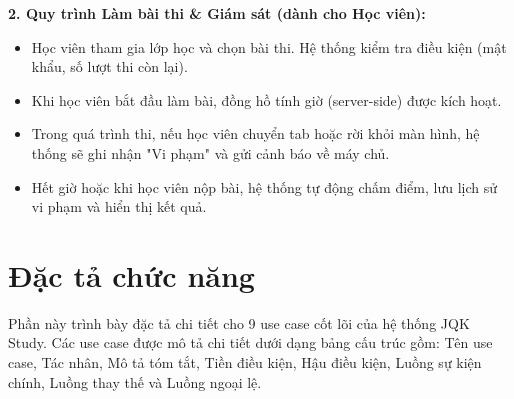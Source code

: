 \documentclass[../DoAn.tex]{subfiles}
\begin{document}
\textbf{2. Quy trình Làm bài thi \& Giám sát (dành cho Học viên):}
\begin{itemize}
    \item Học viên tham gia lớp học và chọn bài thi. Hệ thống kiểm tra điều kiện (mật khẩu, số lượt thi còn lại).
    \item Khi học viên bắt đầu làm bài, đồng hồ tính giờ (server-side) được kích hoạt.
    \item Trong quá trình thi, nếu học viên chuyển tab hoặc rời khỏi màn hình, hệ thống sẽ ghi nhận "Vi phạm" và gửi cảnh báo về máy chủ.
    \item Hết giờ hoặc khi học viên nộp bài, hệ thống tự động chấm điểm, lưu lịch sử vi phạm và hiển thị kết quả.
\end{itemize}

\section{Đặc tả chức năng}
\label{section:2.3}

Phần này trình bày đặc tả chi tiết cho 9 use case cốt lõi của hệ thống JQK Study. Các use case được mô tả chi tiết dưới dạng bảng cấu trúc gồm: Tên use case, Tác nhân, Mô tả tóm tắt, Tiền điều kiện, Hậu điều kiện, Luồng sự kiện chính, Luồng thay thế và Luồng ngoại lệ.

\newpage
\end{document}
